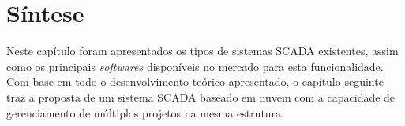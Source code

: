 \section{Síntese}
\label{sec:sintese-scada}

Neste capítulo foram apresentados os tipos de sistemas \gls{SCADA} existentes, assim como os principais \textit{softwares} disponíveis no mercado para esta funcionalidade. Com base em todo o desenvolvimento teórico apresentado, o capítulo seguinte traz a proposta de um sistema \gls{SCADA} baseado em nuvem com a capacidade de gerenciamento de múltiplos projetos na mesma estrutura.